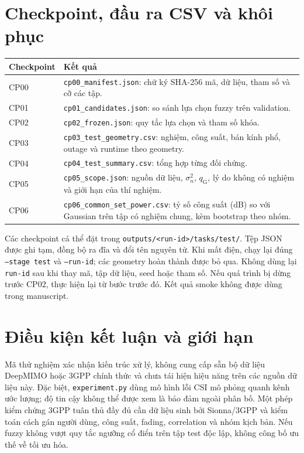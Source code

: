 \documentclass[11pt,onecolumn]{IEEEtran}
\begin{document}
\section{Checkpoint, đầu ra CSV và khôi phục}
\begin{tabular}{p{.25\linewidth}p{.65\linewidth}}\toprule
Checkpoint & Kết quả\\\midrule
CP00 & \texttt{cp00\_manifest.json}: chữ ký SHA-256 mã, dữ liệu, tham số và cỡ các tập.\\
CP01 & \texttt{cp01\_candidates.json}: so sánh lựa chọn fuzzy trên validation.\\
CP02 & \texttt{cp02\_frozen.json}: quy tắc lựa chọn và tham số khóa.\\
CP03 & \texttt{cp03\_test\_geometry.csv}: nghiệm, công suất, bán kính phổ, outage và runtime theo geometry.\\
CP04 & \texttt{cp04\_test\_summary.csv}: tổng hợp từng đối chứng.\\
CP05 & \texttt{cp05\_scope.json}: nguồn dữ liệu, $\sigma_n^2$, $q_{\mathrm G}$, lý do không có nghiệm và giới hạn của thí nghiệm.\\
CP06 & \texttt{cp06\_common\_set\_power.csv}: tỷ số công suất (dB) so với Gaussian trên tập có nghiệm chung, kèm bootstrap theo nhóm.\\\bottomrule\end{tabular}

Các checkpoint cá thể đặt trong \texttt{outputs/<run-id>/tasks/test/}. Tệp JSON được ghi tạm, đồng bộ ra đĩa và đổi tên nguyên tử. Khi mất điện, chạy lại đúng \texttt{--stage test} và \texttt{--run-id}; các geometry hoàn thành được bỏ qua. Không dùng lại \texttt{run-id} sau khi thay mã, tập dữ liệu, seed hoặc tham số. Nếu quá trình bị dừng trước CP02, thực hiện lại từ bước trước đó. Kết quả smoke không được dùng trong manuscript.
\section{Điều kiện kết luận và giới hạn}
Mã thử nghiệm xác nhận kiến trúc xử lý, không cung cấp sẵn bộ dữ liệu DeepMIMO hoặc 3GPP chính thức và chưa tái hiện hiệu năng trên các nguồn dữ liệu này. Đặc biệt, \texttt{experiment.py} dùng mô hình lỗi CSI mô phỏng quanh kênh ước lượng; độ tin cậy không thể được xem là bảo đảm ngoài phân bố. Một phép kiểm chứng 3GPP tuân thủ đầy đủ cần dữ liệu sinh bởi Sionna/3GPP và kiểm toán cách gán người dùng, công suất, fading, correlation và nhóm kịch bản. Nếu fuzzy không vượt quy tắc ngưỡng cổ điển trên tập test độc lập, không công bố ưu thế về tối ưu hóa.
\end{document}
